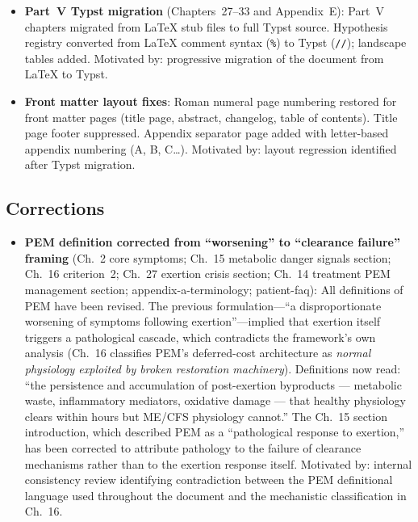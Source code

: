 \begin{itemize}

  \item \textbf{Part~V Typst migration} (Chapters~27--33 and Appendix~E):
    Part~V chapters migrated from LaTeX stub files to full Typst source.
    Hypothesis registry converted from LaTeX comment syntax (\texttt{\%}) to Typst
    (\texttt{//}); landscape tables added.
    Motivated by: progressive migration of the document from LaTeX to Typst.

  \item \textbf{Front matter layout fixes}:
    Roman numeral page numbering restored for front matter pages (title page,
    abstract, changelog, table of contents). Title page footer suppressed.
    Appendix separator page added with letter-based appendix numbering (A, B, C\ldots).
    Motivated by: layout regression identified after Typst migration.

\end{itemize}

\subsection*{Corrections}

\begin{itemize}

  \item \textbf{PEM definition corrected from ``worsening'' to ``clearance failure'' framing}
    (Ch.~2 core symptoms; Ch.~15 metabolic danger signals section; Ch.~16
    criterion~2; Ch.~27 exertion crisis section; Ch.~14 treatment PEM management
    section; appendix-a-terminology; patient-faq):
    All definitions of PEM have been revised. The previous formulation---``a
    disproportionate worsening of symptoms following exertion''---implied that
    exertion itself triggers a pathological cascade, which contradicts the
    framework's own analysis (Ch.~16 classifies PEM's deferred-cost architecture
    as \emph{normal physiology exploited by broken restoration machinery}).
    Definitions now read: ``the persistence and accumulation of post-exertion
    byproducts --- metabolic waste, inflammatory mediators, oxidative damage ---
    that healthy physiology clears within hours but ME/CFS physiology cannot.''
    The Ch.~15 section introduction, which described PEM as a ``pathological
    response to exertion,'' has been corrected to attribute pathology to the
    failure of clearance mechanisms rather than to the exertion response itself.
    Motivated by: internal consistency review identifying contradiction between
    the PEM definitional language used throughout the document and the mechanistic
    classification in Ch.~16.

\end{itemize}

